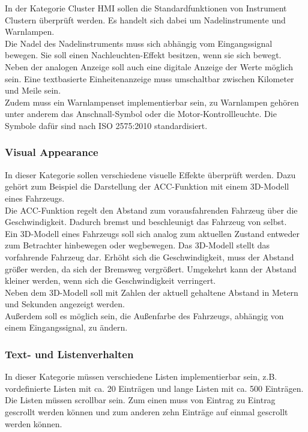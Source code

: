 In der Kategorie Cluster HMI sollen die Standardfunktionen von Instrument Clustern überprüft werden. Es handelt sich dabei um Nadelinstrumente und Warnlampen.\\

Die Nadel des Nadelinstruments muss sich abhängig vom Eingangssignal bewegen. Sie soll einen Nachleuchten-Effekt besitzen, wenn sie sich bewegt. Neben der analogen Anzeige soll auch eine digitale Anzeige der Werte möglich sein. Eine textbasierte Einheitenanzeige muss umschaltbar zwischen Kilometer und Meile sein.\\

Zudem muss ein Warnlampenset implementierbar sein, zu Warnlampen gehören unter anderem das Anschnall-Symbol oder die Motor-Kontrollleuchte. Die Symbole dafür sind nach ISO 2575:2010 standardisiert.\\


\subsubsection{Visual Appearance}
\label{visual}
In dieser Kategorie sollen verschiedene visuelle Effekte überprüft werden. Dazu gehört zum Beispiel die Darstellung der \ac{ACC}-Funktion mit einem 3D-Modell eines Fahrzeugs.\\

Die \ac{ACC}-Funktion regelt den Abstand zum vorausfahrenden Fahrzeug über die Geschwindigkeit. Dadurch bremst und beschleunigt das Fahrzeug von selbst.\\

Ein 3D-Modell eines Fahrzeugs soll sich analog zum aktuellen Zustand entweder zum Betrachter hinbewegen oder wegbewegen. Das 3D-Modell stellt das vorfahrende Fahrzeug dar. Erhöht sich die Geschwindigkeit, muss der Abstand größer werden, da sich der Bremsweg vergrößert. Umgekehrt kann der Abstand kleiner werden, wenn sich die Geschwindigkeit verringert.\\

Neben dem 3D-Modell soll mit Zahlen der aktuell gehaltene Abstand in Metern und Sekunden angezeigt werden.\\

Außerdem soll es möglich sein, die Außenfarbe des Fahrzeugs, abhängig von einem Eingangssignal, zu ändern.\\


\subsubsection{Text- und Listenverhalten}
In dieser Kategorie müssen verschiedene Listen implementierbar sein, z.B. vordefinierte Listen mit ca. 20 Einträgen und lange Listen mit ca. 500 Einträgen. Die Listen müssen scrollbar sein. Zum einen muss von Eintrag zu Eintrag gescrollt werden können und zum anderen zehn Einträge auf einmal gescrollt werden können.\\

